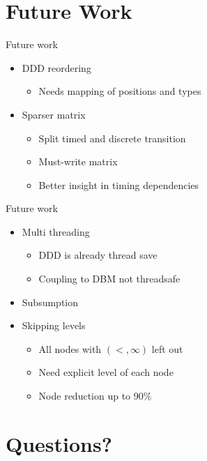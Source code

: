 \section{Future Work}

\begin{frame}{Future work}
\begin{itemize}
	\item DDD reordering
	\begin{itemize}
		\item Needs mapping of positions and types
	\end{itemize}
	\item Sparser matrix
	\begin{itemize}
		\item Split timed and discrete transition
		\item Must-write matrix
		\item Better insight in timing dependencies
	\end{itemize}
\end{itemize}
\end{frame}

\begin{frame}{Future work}
\begin{itemize}
	\item Multi threading
	\begin{itemize}
		\item DDD is already thread save
		\item Coupling to DBM not threadsafe
	\end{itemize}
	\item Subsumption
	\item Skipping levels
	\begin{itemize}
		\item All nodes with $(<,\infty)$ left out
		\item Need explicit level of each node
		\item Node reduction up to 90\%	
	\end{itemize}
\end{itemize}
\end{frame}

\section{Questions?}




